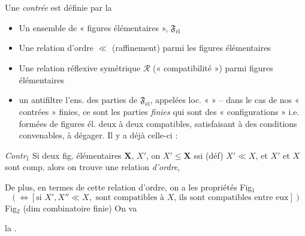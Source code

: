 \documentclass[11pt,a4paper]{article}
\begin{document}
Une \emph{contrée} est définie par la  \ill{}
\begin{itemize}
  \item[1°)] Un ensemble de « figures élémentaires », $\mathfrak{F}_{\mathrm{él}}$
  \item[2°)] Une relation d'ordre \struck{$\leq$} $\ll$ \struck{\ill{}} (raffinement) parmi les figures élémentaires
  \item[3°)] Une relation réflexive symétrique $\mathcal{R}$ (« compatibilité ») parmi  figures élémentaires
  \item[\uncertain{4°)}] \ill{} un antifiltre  l'ens. des parties de $\mathfrak{F}_{\mathrm{él}}$, appelées loc. «  » -- dans le cas de nos « contrées » finies, ce sont les parties \emph{finies} qui sont des « configurations » i.e. formées de figures él. deux à deux compatibles, satisfaisant à des conditions convenables, à dégager. Il y a déjà celle-ci :
\end{itemize}

\emph{Contr$_1$} Si  deux fig. élémentaires $\mathbf{X}$, $X'$, on  $X' \leq \mathbf{X}$ ssi (déf) $X' \ll X$, et $X'$ et $X$ sont comp. alors on trouve une relation \emph{d'ordre},

De plus, en termes de cette relation d'ordre, on a les propriétés Fig$_1$ 
\[
  (\Longleftrightarrow [\text{si } X', X'' \ll X, \text{ sont compatibles à } X \text{, ils sont compatibles entre eux}])
\]
Fig$_2$ (dim combinatoire finie) On va

la  . \struck{--}

\end{document}
